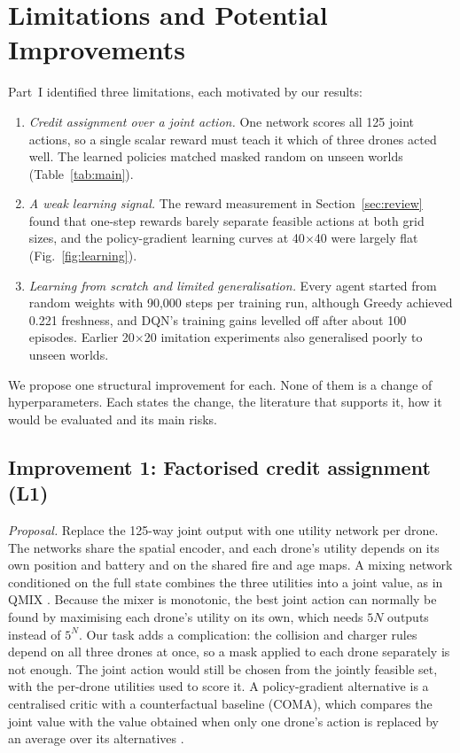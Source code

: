 \section{Limitations and Potential Improvements}
\label{sec:improvements}

Part~I identified three limitations, each motivated by our results:
\begin{enumerate}
\item[L1] \emph{Credit assignment over a joint action.} One network scores all 125 joint
actions, so a single scalar reward must teach it which of three drones acted well. The
learned policies matched masked random on unseen worlds (Table~\ref{tab:main}).
\item[L2] \emph{A weak learning signal.} The reward measurement in
Section~\ref{sec:review} found that one-step rewards barely separate feasible actions at both
grid sizes, and the policy-gradient learning curves at 40$\times$40 were largely flat
(Fig.~\ref{fig:learning}).
\item[L3] \emph{Learning from scratch and limited generalisation.} Every agent started
from random weights with 90{,}000 steps per training run, although Greedy achieved 0.221
freshness, and DQN's training gains levelled off after about 100 episodes. Earlier
20$\times$20 imitation experiments also generalised poorly to unseen worlds.
\end{enumerate}
We propose one structural improvement for each. None of them is a change of hyperparameters.
Each states the change, the literature that supports it, how it would be evaluated and its
main risks.

\subsection{Improvement 1: Factorised credit assignment (L1)}

\emph{Proposal.} Replace the 125-way joint output with one utility network per drone. The
networks share the spatial encoder, and each drone's utility depends on its own position and
battery and on the shared fire and age maps. A mixing network conditioned on the full state
combines the three utilities into a joint value, as in QMIX \cite{rashid2018}. Because the
mixer is monotonic, the best joint action can normally be found by maximising each drone's
utility on its own, which needs $5N$ outputs instead of $5^N$. Our task adds a complication:
the collision and charger rules depend on all three drones at once, so a mask applied to each
drone separately is not enough. The joint action would still be chosen from the jointly
feasible set, with the per-drone utilities used to score it. A policy-gradient alternative is a centralised critic with a counterfactual baseline (COMA),
which compares the joint value with the value obtained when only one drone's action is
replaced by an average over its alternatives \cite{foerster2018coma}.

